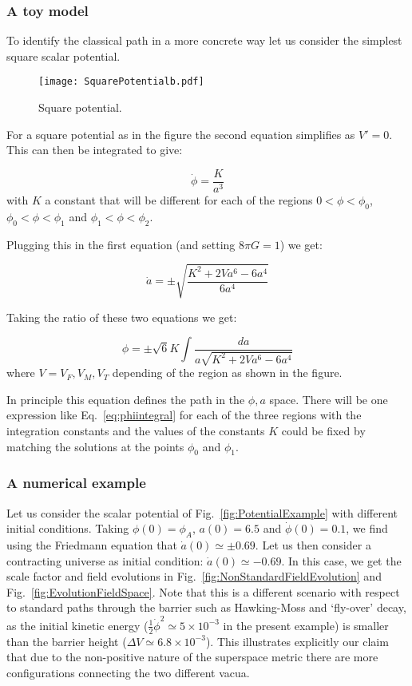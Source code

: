 \documentclass[a4paper,11pt]{article}
\numberwithin{equation}{section}
\newcommand{\be}{\begin{equation}}
\newcommand{\ee}{\end{equation}}
\begin{document}
\begin{itemize}
\subsubsection*{A toy model} 

To identify the classical path in a more concrete way let us consider the simplest square scalar potential.
\begin{figure}[h!] 
\begin{center} 
\texttt{[image: SquarePotentialb.pdf]}
\caption{Square potential.\label{fig:squarepotential}}
\end{center} 
\end{figure}
For a square potential as in the figure the second equation simplifies as $V'=0$. This can then be integrated to give:

\be
\dot\phi=\frac{K}{a^3}
\ee
with $K$ a constant that will be different for each of the regions $0<\phi<\phi_0$, $\phi_0<\phi<\phi_1$ and $\phi_1<\phi<\phi_2$.

Plugging this in the first equation (and setting $8\pi G=1$) we get:

\be
\dot a= \pm\sqrt{\frac{K^2+2Va^6-6a^4}{6a^4}}
\ee

Taking the ratio of these two equations we get:

\be
\phi= \pm \sqrt{6}K\int \frac{da}{a\sqrt{K^2+2Va^6-6a^4}}\label{eq:phiintegral}
\ee
where $V=V_F,V_M,V_T$ depending of the region as shown in the figure.

In principle this equation defines the path in the $\phi,a$ space. There will be  one expression like Eq.~\eqref{eq:phiintegral}  for each of the three regions with the integration constants and the values of the constants $K$ could be fixed by matching the solutions at the points $\phi_0$ and $\phi_1$.

\subsubsection*{A numerical example}

Let us consider the scalar potential of Fig.~\ref{fig:PotentialExample} with different initial conditions. Taking $\phi(0) = \phi_A$, $a(0) = 6.5$ and $\dot\phi(0) = 0.1$, we find using the Friedmann equation that $\dot{a}(0) \simeq \pm 0.69$. Let us then consider a contracting universe as initial condition: $\dot{a}(0) \simeq -0.69$. In this case, we get the scale factor and field evolutions in Fig.~\ref{fig:NonStandardFieldEvolution} and Fig.~\ref{fig:EvolutionFieldSpace}. Note that this is a different scenario with respect to standard  paths through the barrier such as Hawking-Moss and  ‘fly-over’ decay, as the initial kinetic energy ($\frac{1}{2} \dot\phi^{2} \simeq 5 \times 10^{-3}$ in the present example) is smaller than the barrier height ($\Delta V \simeq 6.8 \times 10^{-3}$). This illustrates explicitly our claim that due to the non-positive nature of the superspace metric there are more configurations connecting  the two different vacua.



\end{itemize}
\end{document}
